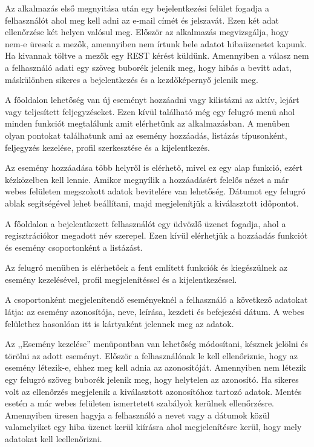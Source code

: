 \documentclass[
]{thesis-ekf}
\theoremstyle{definition}
\theoremstyle{remark}
\begin{document}
Az alkalmazás első megnyitása után egy bejelentkezési felület fogadja a felhasználót ahol meg kell adni az e-mail címét és jelszavát. Ezen két adat ellenőrzése két helyen valósul meg. Először az alkalmazás megvizsgálja, hogy nem-e üresek a mezők, amennyiben nem írtunk bele adatot hibaüzenetet kapunk. Ha kivannak töltve a mezők egy REST kérést küldünk. Amennyiben a válasz nem a felhasználó adati egy szöveg buborék jelenik meg, hogy hibás a bevitt adat, máskülönben sikeres a bejelentkezés és a kezdőképernyő jelenik meg.

A főoldalon lehetőség van új eseményt hozzáadni vagy kilistázni az aktív, lejárt vagy teljesített feljegyzéseket. Ezen kívül található még egy felugró menü ahol minden funkciót megtalálunk amit elérhetünk az alkalmazásban. A menüben olyan pontokat találhatunk ami az esemény hozzáadás, listázás típusonként, feljegyzés kezelése, profil szerkesztése és a kijelentkezés. 

Az esemény hozzáadása több helyről is elérhető, mivel ez egy alap funkció, ezért kézközelben kell lennie. Amikor megnyílik a hozzáadásért felelős nézet a már webes felületen megszokott adatok bevitelére van lehetőség. Dátumot egy felugró ablak segítségével lehet beállítani, majd megjelenítjük a kiválasztott időpontot. 

A főoldalon a bejelentkezett felhasználót egy üdvözlő üzenet fogadja, ahol a regisztrációkor megadott név szerepel. Ezen kívül elérhetjük a hozzáadás funkciót és esemény csoportonként a listázást. 

Az felugró menüben is elérhetőek a fent említett funkciók és kiegészülnek az esemény kezelésével, profil megjelenítéssel és a kijelentkezéssel. 

A csoportonként megjelenítendő eseményeknél a felhasználó a következő adatokat látja: az esemény azonosítója, neve, leírása, kezdeti és befejezési dátum. A webes felülethez hasonlóan itt is kártyaként jelennek meg az adatok. 

Az ,,Esemény kezelése'' menüpontban van lehetőség módosítani, késznek jelölni és törölni az adott eseményt. Először a felhasználónak le kell ellenőriznie, hogy az esemény létezik-e, ehhez meg kell adnia az azonosítóját. Amennyiben nem létezik egy felugró szöveg buborék jelenik meg, hogy helytelen az azonosító. Ha sikeres volt az ellenőrzés megjelenik a kiválasztott azonosítóhoz tartozó adatok. Mentés esetén a már webes felületen ismertetett szabályok kerülnek ellenőrzésre. Amennyiben üresen hagyja a felhasználó a nevet vagy a dátumok közül valamelyiket egy hiba üzenet kerül kiírásra ahol megjelenítésre kerül, hogy mely adatokat kell leellenőrizni. 
\end{document}
